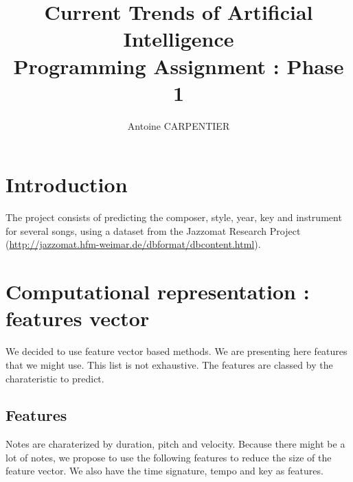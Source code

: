 \documentclass[a4paper,12pt]{article}
\author{Antoine CARPENTIER}
\title{Current Trends of Artificial Intelligence\\ \small Programming Assignment : Phase 1}
\begin{document}
\maketitle

\section{Introduction}

The project consists of predicting the composer, style, year, key and instrument for several songs, using a dataset from the Jazzomat Research Project (\url{http://jazzomat.hfm-weimar.de/dbformat/dbcontent.html}).

\section{Computational representation : features vector}

We decided to use feature vector based methods. We are presenting here features that we might use. This list is not exhaustive. The features are classed by the charateristic to predict.

\subsection{Features}
    Notes are charaterized by duration, pitch and velocity. Because there might be a lot of notes, we propose to use the following features to reduce the size of the feature vector. We also have the time signature, tempo and key as features.
\end{document}
